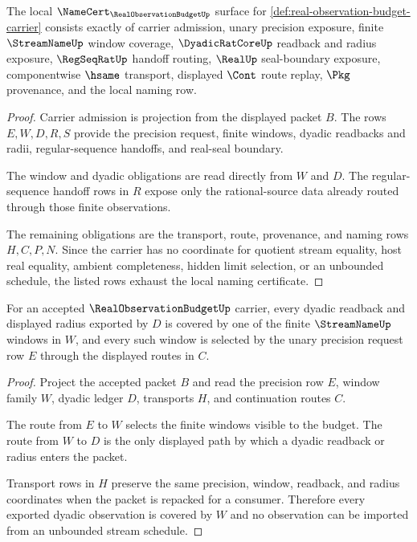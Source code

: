 \begin{theorem}
\label{thm:real-observation-budget-namecert-obligations}
The local $\NameCert_{\RealObservationBudgetUp}$ surface for \autoref{def:real-observation-budget-carrier} consists exactly of carrier admission, unary precision exposure, finite $\StreamNameUp$ window coverage, $\DyadicRatCoreUp$ readback and radius exposure, $\RegSeqRatUp$ handoff routing, $\RealUp$ seal-boundary exposure, componentwise $\hsame$ transport, displayed $\Cont$ route replay, $\Pkg$ provenance, and the local naming row.
\end{theorem}
\begin{proof}
Carrier admission is projection from the displayed packet $B$. The rows $E,W,D,R,S$ provide the precision request, finite windows, dyadic readbacks and radii, regular-sequence handoffs, and real-seal boundary.

The window and dyadic obligations are read directly from $W$ and $D$. The regular-sequence handoff rows in $R$ expose only the rational-source data already routed through those finite observations.

The remaining obligations are the transport, route, provenance, and naming rows $H,C,P,N$. Since the carrier has no coordinate for quotient stream equality, host real equality, ambient completeness, hidden limit selection, or an unbounded schedule, the listed rows exhaust the local naming certificate.
\end{proof}

\begin{theorem}
\label{thm:real-observation-budget-window-coverage}
For an accepted $\RealObservationBudgetUp$ carrier, every dyadic readback and displayed radius exported by $D$ is covered by one of the finite $\StreamNameUp$ windows in $W$, and every such window is selected by the unary precision request row $E$ through the displayed routes in $C$.
\end{theorem}
\begin{proof}
Project the accepted packet $B$ and read the precision row $E$, window family $W$, dyadic ledger $D$, transports $H$, and continuation routes $C$.

The route from $E$ to $W$ selects the finite windows visible to the budget. The route from $W$ to $D$ is the only displayed path by which a dyadic readback or radius enters the packet.

Transport rows in $H$ preserve the same precision, window, readback, and radius coordinates when the packet is repacked for a consumer. Therefore every exported dyadic observation is covered by $W$ and no observation can be imported from an unbounded stream schedule.
\end{proof}

